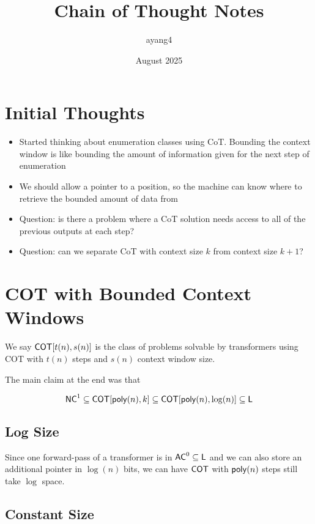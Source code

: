 \documentclass{article}
\title{Chain of Thought Notes}
\author{ayang4 }
\date{August 2025}
\begin{document}
\maketitle

\section{Initial Thoughts}

\begin{itemize}
    \item Started thinking about enumeration classes using CoT. Bounding the context window is like bounding the amount of information given for the next step of enumeration
    \item We should allow a pointer to a position, so the machine can know where to retrieve the bounded amount of data from
    \item Question: is there a problem where a CoT solution needs access to all of the previous outputs at each step?
    \item Question: can we separate CoT with context size $k$ from context size $k+1$? 
\end{itemize}

\section{COT with Bounded Context Windows}

\begin{definition}
    We say $\mathsf{COT}[t(n),s(n)]$ is the class of problems solvable by transformers using COT with $t(n)$ steps and $s(n)$ context window size.
\end{definition}

The main claim at the end was that 

\[\mathsf{NC}^1\subseteq \mathsf{COT}[\mathsf{poly}(n),k] \subseteq \mathsf{COT}[\mathsf{poly}(n),\log(n)]\subseteq \mathsf{L}\]


\subsection{Log Size}

Since one forward-pass of a transformer is in $\mathsf{AC}^0\subseteq\mathsf{L}$ and we can also store an additional pointer in $\log(n)$ bits, we can have $\mathsf{COT}$ with $\mathsf{poly}(n)$ steps still take $\log$ space. 

\subsection{Constant Size}
\end{document}
